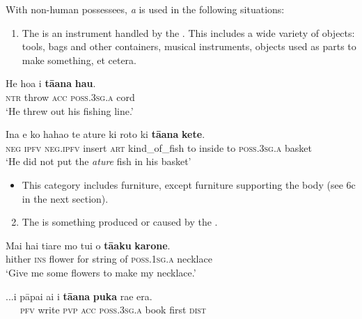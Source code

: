 With non-human possessees, \textit{{\ꞌ}a} is used in the following situations:

\begin{enumerate}
\item 
The  is an instrument handled by the . This includes a wide variety of objects: tools, bags and other containers, musical instruments, objects used as parts to make something, et cetera.

\end{enumerate}

\ea\label{ex:6.69}
\gll He hoa i \textbf{tā{\ꞌ}ana} \textbf{hau}. \\
\textsc{ntr} throw \textsc{acc} \textsc{poss.3sg.a} cord \\

\glt 
‘He threw out his fishing line.’ \textstyleExampleref{[R338.024]} 
\z

\ea\label{ex:6.70}
\gll {\ꞌ}Ina e ko haha{\ꞌ}o te {\ꞌ}ature ki roto ki \textbf{tā{\ꞌ}ana} \textbf{kete}. \\
\textsc{neg} \textsc{ipfv} \textsc{neg.ipfv} insert \textsc{art} kind\_of\_fish to inside to \textsc{poss.3sg.a} basket \\

\glt
‘He did not put the \textit{ature} fish in his basket’ \textstyleExampleref{[Ley-5-27.011]}
\z
\begin{itemize}
\item[]
This category includes furniture, except furniture supporting the body (see 6c in the next section).
\end{itemize}

\begin{enumerate}
\setcounter{enumi}{1}
\item 
The  is something produced or caused by the .

\end{enumerate}

\ea\label{ex:6.71}
\gll Mai hai tiare mo tui o \textbf{tā{\ꞌ}aku} \textbf{karone}. \\
hither \textsc{ins} flower for string of \textsc{poss.1sg.a} necklace \\

\glt 
‘Give me some flowers to make my necklace.’ \textstyleExampleref{[R175.006]} 
\z

\ea\label{ex:6.72}
\gll ...i pāpa{\ꞌ}i ai i \textbf{tā{\ꞌ}ana} \textbf{puka} ra{\ꞌ}e era.\\
~~~\textsc{pfv} write \textsc{pvp} \textsc{acc} \textsc{poss.3sg.a} book first \textsc{dist}\\

